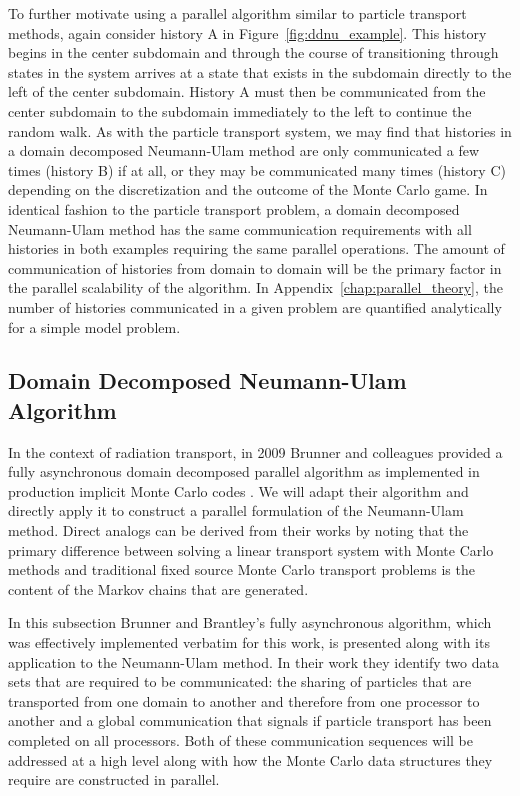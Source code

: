 \documentclass[letterpaper,11pt]{article}
\begin{document}
To further motivate using a parallel algorithm similar to particle
transport methods, again consider history A in
Figure~\ref{fig:ddnu_example}. This history begins in the center
subdomain and through the course of transitioning through states in
the system arrives at a state that exists in the subdomain directly to
the left of the center subdomain. History A must then be communicated
from the center subdomain to the subdomain immediately to the left to
continue the random walk. As with the particle transport system, we
may find that histories in a domain decomposed Neumann-Ulam method are
only communicated a few times (history B) if at all, or they may be
communicated many times (history C) depending on the discretization
and the outcome of the Monte Carlo game. In identical fashion to the
particle transport problem, a domain decomposed Neumann-Ulam method
has the same communication requirements with all histories in both
examples requiring the same parallel operations. The amount of
communication of histories from domain to domain will be the primary
factor in the parallel scalability of the algorithm. In
Appendix~\ref{chap:parallel_theory}, the number of histories
communicated in a given problem are quantified analytically for a
simple model problem.

\subsection{Domain Decomposed Neumann-Ulam Algorithm}
\label{subsec:asynchronous_algorithm}
In the context of radiation transport, in 2009 Brunner and colleagues
provided a fully asynchronous domain decomposed parallel algorithm as
implemented in production implicit Monte Carlo codes
\cite{brunner_efficient_2009}. We will adapt their algorithm and
directly apply it to construct a parallel formulation of the
Neumann-Ulam method. Direct analogs can be derived from their works by
noting that the primary difference between solving a linear transport
system with Monte Carlo methods and traditional fixed source Monte
Carlo transport problems is the content of the Markov chains that are
generated.

In this subsection Brunner and Brantley's fully asynchronous algorithm,
which was effectively implemented verbatim for this work, is presented
along with its application to the Neumann-Ulam method. In their work
they identify two data sets that are required to be communicated: the
sharing of particles that are transported from one domain to another
and therefore from one processor to another and a global communication
that signals if particle transport has been completed on all
processors. Both of these communication sequences will be addressed at
a high level along with how the Monte Carlo data structures they
require are constructed in parallel.
\end{document}
